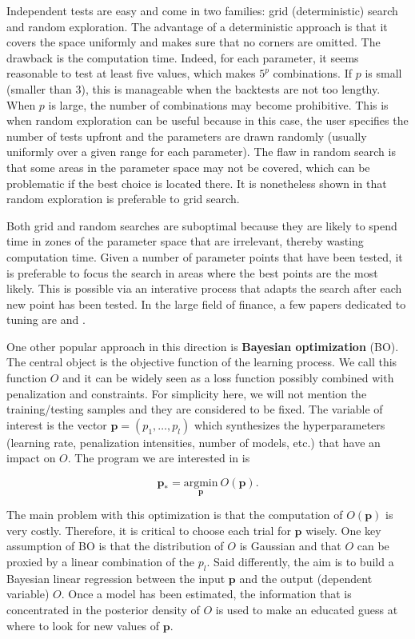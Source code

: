 Independent tests are easy and come in two families: grid (deterministic) search and random exploration. The advantage of a deterministic approach is that it covers the space uniformly and makes sure that no corners are omitted. The drawback is the computation time. Indeed, for each parameter, it seems reasonable to test at least five values, which makes $5^p$ combinations. If $p$ is small (smaller than 3), this is manageable when the backtests are not too lengthy. When $p$ is large, the number of combinations may become prohibitive. This is when random exploration can be useful because in this case, the user specifies the number of tests upfront and the parameters are drawn randomly (usually uniformly over a given range for each parameter). The flaw in random search is that some areas in the parameter space may not be covered, which can be problematic if the best choice is located there. It is nonetheless shown in \cite{bergstra2012random} that random exploration is preferable to grid search.

Both grid and random searches are suboptimal because they are likely to spend time in zones of the parameter space that are irrelevant, thereby wasting computation time. Given a number of parameter points that have been tested, it is preferable to focus the search in areas where the best points are the most likely. This is possible via an interative process that adapts the search after each new point has been tested. In the large field of finance, a few papers dedicated to tuning are \cite{lee2020hyperparameter} and \cite{nystrup2020hyperparameter}.

One other popular approach in this direction is \textbf{Bayesian optimization} (BO). The central object is the objective function of the learning process. We call this function $O$ and it can be widely seen as a loss function possibly combined with penalization and constraints. For simplicity here, we will not mention the training/testing samples and they are considered to be fixed. The variable of interest is the vector $\textbf{p}=(p_1,\dots,p_l)$ which synthesizes the hyperparameters (learning rate, penalization intensities, number of models, etc.) that have an impact on $O$. The program we are interested in is

\begin{equation}
\label{eq-HPO}
\textbf{p}_*=\underset{\textbf{p}}{\text{argmin}} \ O(\textbf{p}).
\end{equation}

The main problem with this optimization is that the computation of $O(\textbf{p})$ is very costly. Therefore, it is critical to choose each trial for $\textbf{p}$ wisely. One key assumption of BO is that the distribution of $O$ is Gaussian and that $O$ can be proxied by a linear combination of the $p_l$. Said differently, the aim is to build a Bayesian linear regression between the input $\textbf{p}$ and the output (dependent variable) $O$. Once a model has been estimated, the information that is concentrated in the posterior density of $O$ is used to make an educated guess at where to look for new values of $\textbf{p}$.

